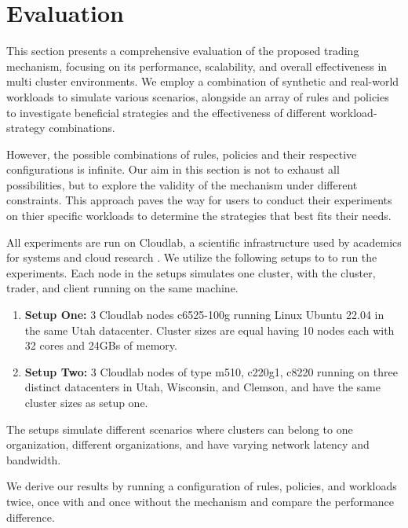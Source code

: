 \chapter{Evaluation}

This section presents a comprehensive evaluation of the proposed trading
mechanism, focusing on its performance, scalability, and overall effectiveness
in multi cluster environments. We employ a combination of synthetic and
real-world workloads to simulate various scenarios, alongside an array of rules
and policies to investigate beneficial strategies and the effectiveness of
different workload-strategy combinations.

However, the possible combinations of rules, policies and their respective
configurations is infinite. Our aim in this section is not to exhaust all
possibilities, but to explore the validity of the mechanism under different
constraints. This approach paves the way for users to conduct their experiments
on thier specific workloads to determine the strategies that best fits their
needs.  

All experiments are run on Cloudlab, a scientific infrastructure used by
academics for systems and cloud research \cite{duplyakin_design_2019}. We utilize the following
setups to to run the experiments. Each node in the setups simulates one
cluster, with the cluster, trader, and client running on the same machine. 
\begin{enumerate}

  \item \textbf{Setup One:} 3 Cloudlab nodes c6525-100g running Linux
    Ubuntu 22.04 in the same Utah datacenter. Cluster sizes are equal having 10
    nodes each with 32 cores and 24GBs of memory.

  \item \textbf{Setup Two:} 3 Cloudlab nodes of type m510, c220g1, c8220 running on three distinct datacenters in Utah, Wisconsin,
    and Clemson, and have the same cluster sizes as setup one.

\end{enumerate}

The setups simulate different scenarios where clusters can belong to one
organization, different organizations, and have varying network latency and
bandwidth.  

We derive our results by running a configuration of rules, policies, and
workloads twice, once with and once without the mechanism and compare the
performance difference.

